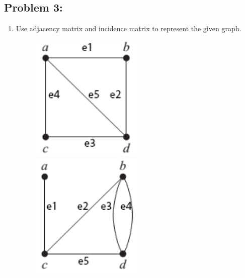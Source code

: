 \documentclass[a4paper]{article}
\begin{document}
	\subsection*{Problem 3:}
	\begin{enumerate}
		\item Use adjacency matrix and incidence matrix to represent the given graph.
		\begin{figure}[ht]
			\begin{minipage}{0.3\textwidth}
				\centering
				\includegraphics[width=0.5\textwidth]{gprob3_1.png}
			\end{minipage}
			\begin{minipage}{0.3\textwidth}
				\centering
				\includegraphics[width=0.5\textwidth]{gprob3_2.png}
			\end{minipage}
			\begin{minipage}{0.3\textwidth}
				\centering

\end{minipage}
\end{figure}
\end{enumerate}
\end{document}
